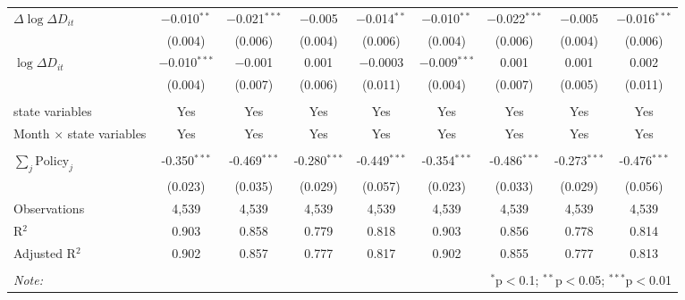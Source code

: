 \begin{tabular}{@{\extracolsep{1pt}}lcccccccc}
  $\Delta \log \Delta D_{it}$ & $-$0.010$^{**}$ & $-$0.021$^{***}$ & $-$0.005 & $-$0.014$^{**}$ & $-$0.010$^{**}$ & $-$0.022$^{***}$ & $-$0.005 & $-$0.016$^{***}$ \\ 
  & (0.004) & (0.006) & (0.004) & (0.006) & (0.004) & (0.006) & (0.004) & (0.006) \\ 
  $\log \Delta D_{it}$ & $-$0.010$^{***}$ & $-$0.001 & 0.001 & $-$0.0003 & $-$0.009$^{***}$ & 0.001 & 0.001 & 0.002 \\ 
  & (0.004) & (0.007) & (0.006) & (0.011) & (0.004) & (0.007) & (0.005) & (0.011) \\ 
 \hline \\[-1.8ex] 
state variables & Yes & Yes & Yes & Yes & Yes & Yes & Yes & Yes \\ 
Month $\times$ state variables & Yes & Yes & Yes & Yes & Yes & Yes & Yes & Yes \\ 
\hline \\[-1.8ex] 
$\sum_j \mathrm{Policy}_j$ & -0.350$^{***}$ & -0.469$^{***}$ & -0.280$^{***}$ & -0.449$^{***}$ & -0.354$^{***}$ & -0.486$^{***}$ & -0.273$^{***}$ & -0.476$^{***}$ \\ 
 & (0.023) & (0.035) & (0.029) & (0.057) & (0.023) & (0.033) & (0.029) & (0.056) \\ 
Observations & 4,539 & 4,539 & 4,539 & 4,539 & 4,539 & 4,539 & 4,539 & 4,539 \\ 
R$^{2}$ & 0.903 & 0.858 & 0.779 & 0.818 & 0.903 & 0.856 & 0.778 & 0.814 \\ 
Adjusted R$^{2}$ & 0.902 & 0.857 & 0.777 & 0.817 & 0.902 & 0.855 & 0.777 & 0.813 \\ 
\hline 
\hline \\[-1.8ex] 
\textit{Note:}  & \multicolumn{8}{r}{$^{*}$p$<$0.1; $^{**}$p$<$0.05; $^{***}$p$<$0.01} \\ 
\end{tabular} 